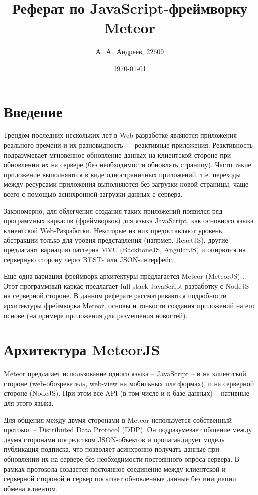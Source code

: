 \documentclass[a4paper,12pt]{article}
\begin{document}
\title{Реферат по JavaScript-фреймворку Meteor}
\author{А.~А.~Андреев, 22609}
\date{\today}
\maketitle

\large

\section*{Введение}
Трендом последних нескольких лет в Web-разработке являются приложения реального
времени и их разновидность --- реактивные приложения. Реактивность подразумевает
мгновенное обновление данных на клиентской стороне при обновлении их на сервере
(без необходимости обновлять страницу). Часто такие приложение выполняются в виде
одностраничных приложений, т.е. переходы между ресурсами приложения выполняются
без загрузки новой страницы, чаще всего с помощью асинхронной загрузки данных
с сервера. 

Закономерно, для облегчения создания таких приложений появился ряд программных
каркасов (фреймворков) для языка JavaScript, как основного языка клиентской
Web-Разработки. Некоторые из них предоставляют уровень абстракции
только для уровня представления (напрмер, ReactJS), другие предлагают
вариацию паттерна MVC (BackboneJS, AngularJS) и опирются на серверную сторону
через REST- или JSON-интерфейс.

Еще одна вариация фреймворк-архитектуры предлагается Meteor (MeteorJS) \cite{meteor}. 
Этот программный каркас предлагает full stack JavaScript разработку
с NodeJS на серверной стороне. В данном реферате рассматриваются 
подробности архитектуры фреймворка Meteor, основы и тонкости создания
приложений на его основе (на примере приложения для размещения новостей).

\section{Архитектура MeteorJS}
Meteor предлагает использование одного языка -- JavaScript -- и на
клиентской стороне (web-обозреватель, web-view на мобильных платформах), и
на серверной стороне (NodeJS). При этом все API (в том числе и к базе
данных) -- нативные для этого языка.

Для общения между двумя сторонами в Meteor используется собственный протокол --
Distributed Data Protocol (DDP). Он подразумевает общение между двумя сторонами
посредством JSON-объектов и пропагандирует модель публикация-подписка,
что позволяет асинхронно получать данные при обновлении их на сервере
без необходимости постоянного опроса сервера. В рамках протокола создается
постоянное соединение между клиентской и серверной стороной и сервер посылает
обновленные данные без инициации обмена клиентом.
\end{document}
